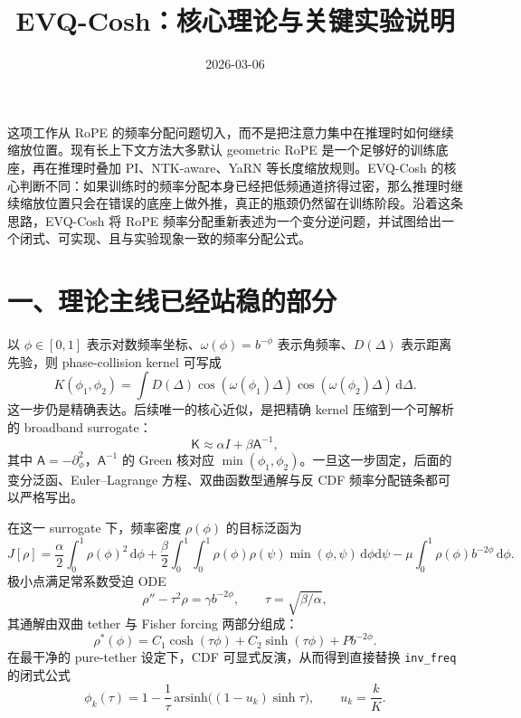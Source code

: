 \documentclass[11pt]{article}
\title{EVQ-Cosh：核心理论与关键实验说明}
\author{}
\date{2026-03-06}
\begin{document}
\maketitle

这项工作从 RoPE 的频率分配问题切入，而不是把注意力集中在推理时如何继续缩放位置。现有长上下文方法大多默认 geometric RoPE 是一个足够好的训练底座，再在推理时叠加 PI、NTK-aware、YaRN 等长度缩放规则。EVQ-Cosh 的核心判断不同：如果训练时的频率分配本身已经把低频通道挤得过密，那么推理时继续缩放位置只会在错误的底座上做外推，真正的瓶颈仍然留在训练阶段。沿着这条思路，EVQ-Cosh 将 RoPE 频率分配重新表述为一个变分逆问题，并试图给出一个闭式、可实现、且与实验现象一致的频率分配公式。

\section*{一、理论主线已经站稳的部分}

以 \(\phi\in[0,1]\) 表示对数频率坐标、\(\omega(\phi)=b^{-\phi}\) 表示角频率、\(D(\Delta)\) 表示距离先验，则 phase-collision kernel 可写成
\begin{equation}
K(\phi_1,\phi_2)=\int D(\Delta)\cos(\omega(\phi_1)\Delta)\cos(\omega(\phi_2)\Delta)\,\mathrm d\Delta .
\end{equation}
这一步仍是精确表达。后续唯一的核心近似，是把精确 kernel 压缩到一个可解析的 broadband surrogate：
\begin{equation}
\mathsf K \approx \alpha I+\beta \mathsf A^{-1},
\end{equation}
其中 \(\mathsf A=-\partial_\phi^2\)，\(\mathsf A^{-1}\) 的 Green 核对应 \(\min(\phi_1,\phi_2)\)。一旦这一步固定，后面的变分泛函、Euler--Lagrange 方程、双曲函数型通解与反 CDF 频率分配链条都可以严格写出。

在这一 surrogate 下，频率密度 \(\rho(\phi)\) 的目标泛函为
\begin{equation}
J[\rho]
=\frac{\alpha}{2}\int_0^1\rho(\phi)^2\,\mathrm d\phi
+\frac{\beta}{2}\int_0^1\int_0^1\rho(\phi)\rho(\psi)\min(\phi,\psi)\,\mathrm d\phi\mathrm d\psi
-\mu\int_0^1 \rho(\phi)b^{-2\phi}\,\mathrm d\phi.
\end{equation}
极小点满足常系数受迫 ODE
\begin{equation}
\rho''-\tau^2\rho=\gamma b^{-2\phi},\qquad \tau=\sqrt{\beta/\alpha},
\end{equation}
其通解由双曲 tether 与 Fisher forcing 两部分组成：
\begin{equation}
\rho^*(\phi)=C_1\cosh(\tau\phi)+C_2\sinh(\tau\phi)+P b^{-2\phi}.
\end{equation}
在最干净的 pure-tether 设定下，CDF 可显式反演，从而得到直接替换 \texttt{inv\_freq} 的闭式公式
\begin{equation}
\phi_k(\tau)=1-\frac{1}{\tau}\,\mathrm{arsinh}\!\bigl((1-u_k)\sinh\tau\bigr),\qquad u_k=\frac{k}{K}.
\end{equation}
\end{document}
